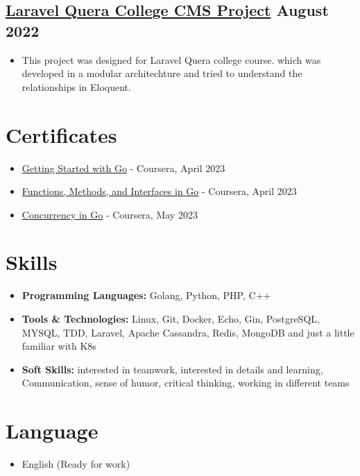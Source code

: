 \documentclass[11pt]{article}
\begin{document}
\subsection[Laravel Quera College CMS Project]{\href{http://laravel.qcollege.ir/}{Laravel Quera College CMS Project} \hfill \textcolor{secondaryColor}{\small August 2022}}
\begin{itemize}
    \item[\color{primaryColor}\small\faLaptopCode] \small{This project was designed for Laravel Quera college course. which was developed in a modular architechture and tried to understand the relationships in Eloquent.}
\end{itemize}


\section{Certificates}
\begin{itemize}
    \item[\color{primaryColor}\small\faCertificate] \href{https://www.coursera.org/account/accomplishments/certificate/L88EK5G4WBPC}{Getting Started with Go} - Coursera, April 2023
    \item[\color{primaryColor}\small\faCertificate] \href{https://www.coursera.org/account/accomplishments/certificate/KN4JUE7SPLKE}{Functions, Methods, and Interfaces in Go} - Coursera, April 2023
    \item[\color{primaryColor}\small\faCertificate] \href{https://www.coursera.org/account/accomplishments/certificate/MCKPES48VB8Y}{Concurrency in Go} - Coursera, May 2023
\end{itemize}


\section{Skills}
\begin{itemize}
    \item \textbf{Programming Languages:} Golang, Python, PHP, C++
    \item \textbf{Tools \& Technologies:} Linux, Git, Docker, Echo, Gin, PostgreSQL, MYSQL, TDD, Laravel, Apache Cassandra, Redis, MongoDB and just a little familiar with K8s
    \item \textbf{Soft Skills:} interested in teamwork, interested in details and learning, Communication, sense of humor, critical thinking, working in different teams
\end{itemize}


\section{Language}
\begin{itemize}
    \item English (Ready for work)
\end{itemize}
\end{document}
